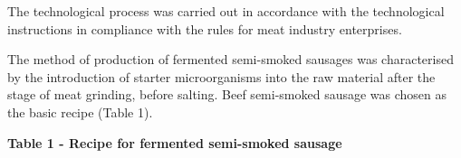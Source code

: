 The technological process was carried out in accordance with the
technological instructions in compliance with the rules for meat
industry enterprises.

The method of production of fermented semi-smoked sausages was
characterised by the introduction of starter microorganisms into the raw
material after the stage of meat grinding, before salting. Beef
semi-smoked sausage was chosen as the basic recipe (Table 1).

{\bfseries Table 1 - Recipe for fermented semi-smoked sausage}


